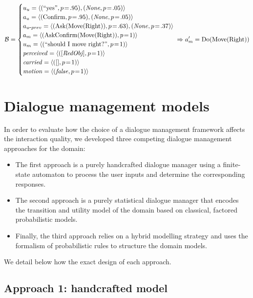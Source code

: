 \begin{align*}
\mathcal{B} = \begin{cases} u_u = \langle (``\text{yes}", p\!=\!.95), (\mathit{None}, p\!=\!.05) \rangle \\
a_u = \langle (\mathrm{Confirm}, p\!=\!.95), (\mathit{None}, p\!=\!.05) \rangle \\
a_{u\mbox{-}prev} = \langle (\mathrm{Ask(Move(Right))}, p\!=\!.63), (\mathit{None}, p\!=\!.37) \rangle \\
a_m = \langle (\mathrm{AskConfirm(Move(Right))}, p\!=\!1) \rangle \\
u_m = \langle (``\text{should I move right?}", p\!=\!1) \rangle \\
\mathit{perceived} = \langle ([\mathit{RedObj}], p\!=\!1) \rangle \\
\mathit{carried} = \langle ([], p\!=\!1) \rangle \\
\mathit{motion} = \langle (\mathit{false}, p\!=\!1) \rangle \\
 \end{cases} \!\!\!\!\!\Rightarrow a_m' = \mathrm{Do(Move(Right))}
\end{align*}


\section{Dialogue management models}
\label{sec:dialmodels_exp3}

In order to evaluate how the choice of a dialogue management framework affects the interaction quality, we developed three competing dialogue management approaches for the domain:
\begin{itemize} 
\item The first approach is a purely handcrafted dialogue manager using a finite-state automaton to process the user inputs and determine the corresponding responses. 
\item The second approach is a purely statistical dialogue manager that encodes the transition and utility model of the domain based on classical, factored probabilistic models.
\item Finally, the third approach relies on a hybrid modelling strategy and uses the formalism of probabilistic rules to structure the domain models.
\end{itemize}

We detail below how the exact design of each approach.

\subsection{Approach 1: handcrafted model}
\label{sec:approach1}


